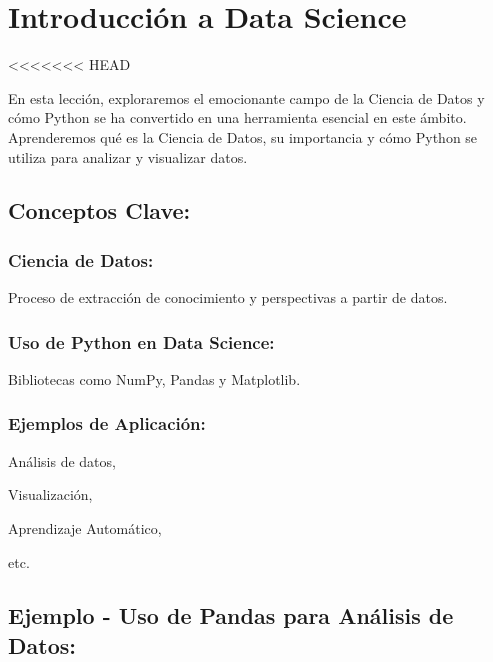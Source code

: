 \documentclass[
  a4paper,
  DIV=11,
  numbers=noendperiod,
  onepage,
  openany]{scrreprt}
\begin{document}
\hypertarget{introducciuxf3n-a-data-science}{%
\chapter{Introducción a Data
Science}\label{introducciuxf3n-a-data-science}}

\textless\textless\textless\textless\textless\textless\textless{} HEAD

En esta lección, exploraremos el emocionante campo de la Ciencia de
Datos y cómo Python se ha convertido en una herramienta esencial en este
ámbito. Aprenderemos qué es la Ciencia de Datos, su importancia y cómo
Python se utiliza para analizar y visualizar datos.

\hypertarget{conceptos-clave-62}{%
\section{Conceptos Clave:}\label{conceptos-clave-62}}

\hypertarget{ciencia-de-datos}{%
\subsection{Ciencia de Datos:}\label{ciencia-de-datos}}

Proceso de extracción de conocimiento y perspectivas a partir de datos.

\hypertarget{uso-de-python-en-data-science}{%
\subsection{Uso de Python en Data
Science:}\label{uso-de-python-en-data-science}}

Bibliotecas como NumPy, Pandas y Matplotlib.

\hypertarget{ejemplos-de-aplicaciuxf3n}{%
\subsection{Ejemplos de Aplicación:}\label{ejemplos-de-aplicaciuxf3n}}

Análisis de datos,

Visualización,

Aprendizaje Automático,

etc.

\hypertarget{ejemplo---uso-de-pandas-para-anuxe1lisis-de-datos}{%
\section{Ejemplo - Uso de Pandas para Análisis de
Datos:}\label{ejemplo---uso-de-pandas-para-anuxe1lisis-de-datos}}
\end{document}
